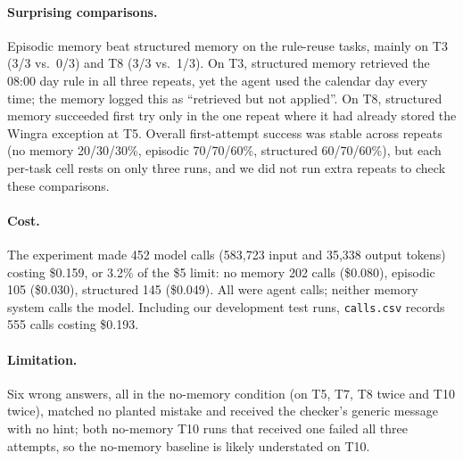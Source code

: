 \paragraph{Surprising comparisons.}
Episodic memory beat structured memory on the rule-reuse tasks, mainly on T3 (3/3 vs.\ 0/3)
and T8 (3/3 vs.\ 1/3). On T3, structured memory retrieved the 08:00 day rule in all three
repeats, yet the agent used the calendar day every time; the memory logged this as
``retrieved but not applied''. On T8, structured memory succeeded first try only in the one
repeat where it had already stored the Wingra exception at T5. Overall first-attempt success
was stable across repeats (no memory 20/30/30\%, episodic 70/70/60\%, structured
60/70/60\%), but each per-task cell rests on only three runs, and we did not run extra
repeats to check these comparisons.

\paragraph{Cost.}
The experiment made 452 model calls (583{,}723 input and 35{,}338 output tokens) costing
\$0.159, or 3.2\% of the \$5 limit: no memory 202 calls (\$0.080), episodic 105 (\$0.030),
structured 145 (\$0.049). All were agent calls; neither memory system calls the model.
Including our development test runs, \texttt{calls.csv} records 555 calls costing \$0.193.

\paragraph{Limitation.}
Six wrong answers, all in the no-memory condition (on T5, T7, T8 twice and T10 twice),
matched no planted mistake and received the checker's generic message with no hint; both
no-memory T10 runs that received one failed all three attempts, so the no-memory baseline is
likely understated on T10.
